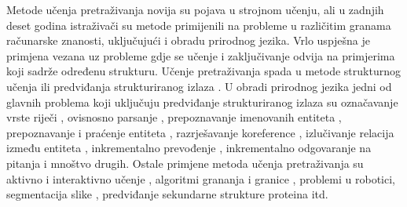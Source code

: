 Metode učenja pretraživanja  novija su
pojava u strojnom učenju, ali u zadnjih deset godina istraživači su metode
primijenili na probleme u različitim granama računarske znanosti, uključujući i
obradu prirodnog jezika. Vrlo uspješna je primjena vezana uz probleme gdje se
učenje i zaključivanje odvija na primjerima koji sadrže određenu strukturu.
Učenje pretraživanja spada u metode strukturnog učenja  ili predviđanja strukturiranog izlaza . U obradi prirodnog jezika jedni od glavnih problema koji uključuju
predviđanje strukturiranog izlaza su označavanje vrste riječi
, ovisnosno parsanje ,
prepoznavanje imenovanih entiteta , prepoznavanje
i praćenje entiteta , razrješavanje
koreference , izlučivanje relacija između entiteta
, inkrementalno prevođenje , inkrementalno odgovaranje na pitanja  i mnoštvo drugih. Ostale primjene metoda učenja pretraživanja su
aktivno i interaktivno učenje , algoritmi
grananja i granice , problemi u robotici, segmentacija
slike , predviđanje sekundarne strukture proteina
 itd.

